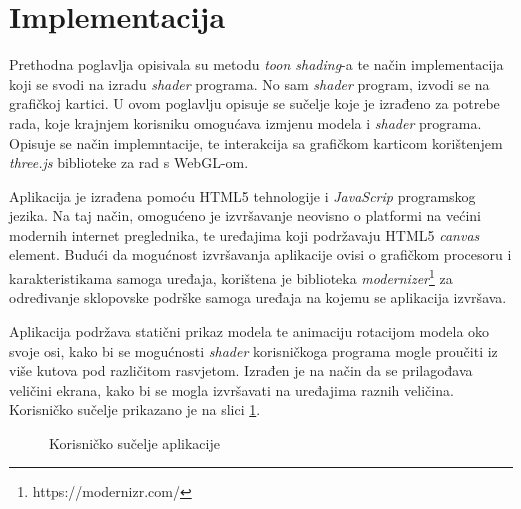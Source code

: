 \section{Implementacija}

Prethodna poglavlja opisivala su metodu \emph{toon shading}-a te način implementacija koji se svodi na izradu \emph{shader} programa. No sam \emph{shader} program, izvodi se na grafičkoj kartici. U ovom poglavlju opisuje se sučelje koje je izrađeno za potrebe rada, koje krajnjem korisniku omogućava izmjenu modela i \emph{shader} programa. Opisuje se način implemntacije, te interakcija sa grafičkom karticom korištenjem \emph{three.js} biblioteke za rad s WebGL-om.

Aplikacija je izrađena pomoću HTML5 tehnologije i \emph{JavaScrip} programskog jezika. Na taj način, omogućeno je izvršavanje neovisno o platformi na većini modernih internet preglednika, te uređajima koji podržavaju HTML5 \emph{canvas} element. Budući da mogućnost izvršavanja aplikacije ovisi o grafičkom procesoru i karakteristikama samoga uređaja, korištena je biblioteka \emph{modernizer}\footnote{https://modernizr.com/} za određivanje sklopovske podrške samoga uređaja na kojemu se aplikacija izvršava.

Aplikacija podržava statični prikaz modela te animaciju rotacijom modela oko svoje osi, kako bi se mogućnosti \emph{shader} korisničkoga programa mogle proučiti iz više kutova pod različitom rasvjetom. Izrađen je na način da se prilagođava veličini ekrana, kako bi se mogla izvršavati na uređajima raznih veličina. Korisničko sučelje prikazano je na slici \ref{fig:interface}.

\begin{figure}[H]
\centering{}
\caption{Korisničko sučelje aplikacije}
\label{fig:interface}
\end{figure}

